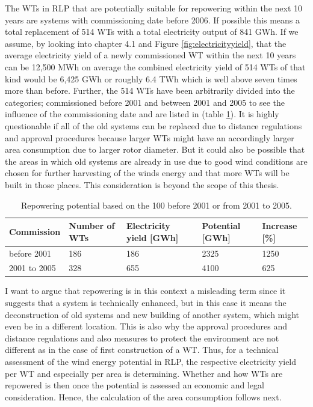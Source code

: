 \documentclass[a4paper,11pt]{article}
\begin{document}
The WTs in RLP that are potentially suitable for repowering within the next 10 years are systems with commissioning date before 2006. If possible this means a total replacement of 514 WTs with a total electricity output of 841 GWh. If we assume, by looking into chapter 4.1 and Figure \ref{fig:electricityyield}, that the average electricity yield of a newly commissioned WT within the next 10 years can be 12,500 MWh on average the combined electricity yield of 514 WTs of that kind would be 6,425 GWh or roughly 6.4 TWh which is well above seven times more than before. Further, the 514 WTs have been arbitrarily divided into the categories; commissioned before 2001 and between 2001 and 2005 to see the influence of the commissioning date and are listed in (table \ref{tab:table1}). It is highly questionable if all of the old systems can be replaced due to distance regulations and approval procedures because larger WTs might have an accordingly larger area consumption due to larger rotor diameter. But it could also be possible that the areas in which old systems are already in use due to good wind conditions are chosen for further harvesting of the winds energy and that more WTs will be built in those places. This consideration is beyond the scope of this thesis.
\begin{table}[H]

\caption{\label{tab:table1}Repowering potential based on the 100%
  before 2001 or from 2001 to 2005.}
\centering
\begin{tabular}[t]{lllll}
\toprule
Commission & Number of WTs & Electricity yield [GWh] & Potential [GWh] & Increase [\%]\\
\midrule
before 2001 & 186 & 186 & 2325 & 1250\\
2001 to 2005 & 328 & 655 & 4100 & 625\\
\midrule
\bottomrule
\end{tabular}
\end{table}
I want to argue that repowering is in this context a misleading term since it suggests that a system is technically enhanced, but in this case it means the deconstruction of old systems and new building of another system, which might even be in a different location. This is also why the approval procedures and distance regulations and also measures to protect the environment are not different as in the case of first construction of a WT. Thus, for a technical assessment of the wind energy potential in RLP, the respective electricity yield per WT and especially per area is determining. Whether and how WTs are repowered is then once the potential is assessed an economic and legal consideration. Hence, the calculation of the area consumption follows next.
\end{document}
